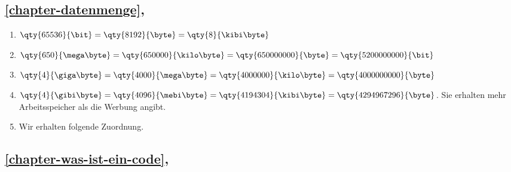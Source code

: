 
\subsection{\autoref{chapter-datenmenge}, }

\begin{enumerate}
\item $\qty{65536}{\bit} = \qty{8192}{\byte} = \qty{8}{\kibi\byte}$
\item $\qty{650}{\mega\byte} = \qty{650000}{\kilo\byte} = \qty{650000000}{\byte} = \qty{5200000000}{\bit}$
\item $\qty{4}{\giga\byte} = \qty{4000}{\mega\byte} = \qty{4000000}{\kilo\byte} = \qty{4000000000}{\byte}$
\item $\qty{4}{\gibi\byte} = \qty{4096}{\mebi\byte} = \qty{4194304}{\kibi\byte} = \qty{4294967296}{\byte}$. Sie erhalten mehr Arbeitsspeicher als die Werbung angibt.
\item Wir erhalten folgende Zuordnung.
\begin{enumerate}
\end{enumerate}
\end{enumerate}

\subsection{\autoref{chapter-was-ist-ein-code}, }

